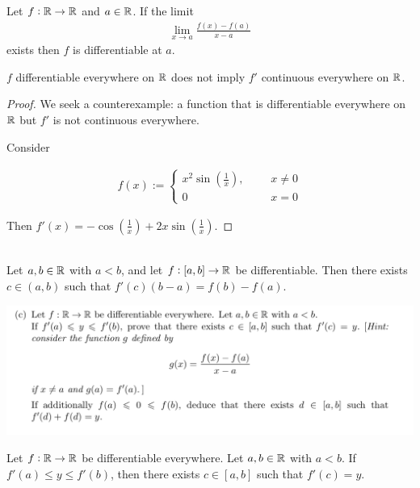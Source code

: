 \documentclass[12pt]{article}
\begin{document}
\begin{definition*}
  Let $f: \mathbb{R} \to \mathbb{R}$ and $a \in \mathbb{R}$. If the limit
  \begin{align*}
    \lim_{x \to a} \frac{f(x) - f(a)}{x - a}
  \end{align*}
  exists then $f$ is differentiable at $a$.
\end{definition*}




\begin{theorem*}
  $f$ differentiable everywhere on $\mathbb{R}$ does not imply $f'$ continuous everywhere on $\mathbb{R}$.
\end{theorem*}

\begin{proof}
We seek a counterexample: a function that is differentiable everywhere on $\mathbb{R}$ but $f'$ is not
continuous everywhere.

Consider

\begin{align*}
  f(x) :=
  \begin{cases}
    x^2\sin(\frac{1}{x}),~~~~~~~&x \neq 0\\
    0                    ~~~~~~~&x = 0
  \end{cases}
\end{align*}

Then $f'(x) = -\cos(\frac{1}{x}) + 2x\sin(\frac{1}{x})$.
\end{proof}


\begin{theorem*}~\\
  Let $a, b \in \mathbb{R}$ with $a < b$, and let $f:[a, b] \to \mathbb{R}$ be differentiable. Then there exists
  $c \in (a, b)$ such that $f'(c)(b - a) = f(b) - f(a)$.
\end{theorem*}


\begin{mdframed}
\includegraphics[width=400pt]{img/misc--cambridge-1a-2017-1-9D-3.png}
\end{mdframed}


\begin{theorem*}
  Let $f: \mathbb{R} \to \mathbb{R}$ be differentiable everywhere. Let $a, b \in \mathbb{R}$ with $a < b$. If
  $f'(a) \leq y \leq f'(b)$, then there exists $c \in [a, b]$ such that $f'(c) = y$.
\end{theorem*}
\end{document}
